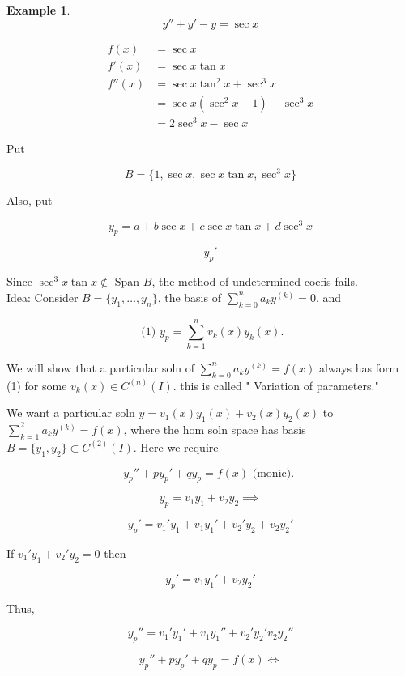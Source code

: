 \documentclass[12pt,a4paper]{article}
\theoremstyle{definition}
\newtheorem*{example}{Example}
\begin{document}
\begin{example}
  \[ y'' + y' - y = \sec x \]

  \begin{align*}
    f(x) &= \sec x \\
    f'(x) &= \sec x \tan x \\
    f''(x) &= \sec x \tan^2x + \sec^3x \\
    &= \sec x (\sec^2x - 1) + \sec^3x \\
    &= 2\sec^3x - \sec x
  \end{align*}

  Put 

  \[ B = \{ 1, \sec x, \sec x \tan x, \sec^3x \}  \]

  Also, put 

  \[ y_p = a + b \sec x + c\sec x \tan x + d \sec^3x \]

  \[ y_p'  \]

  Since \( \sec^3x \tan x \notin  \) Span \( B \), the method of
  undetermined coefis fails. \\[5mm]

  Idea: Consider \( B = \{ y_1, \dots, y_n \} \), the basis of \(
  \sum_{k=0}^{n} a_k y^{(k)} = 0 \), and 

  \[ \text{ (1) } y_p = \sum_{k=1}^{n} v_k(x) y_k(x). \]

  We will show that a particular soln of \( \sum_{k=0}^{n} a_k y^{(k)}
  = f(x)  \) always has form (1) for some \( v_k(x) \in C^{(n)} (I) \).
  this is called " Variation of parameters."

\end{example}


We want a particular soln \( y = v_1(x) y_1(x) + v_2(x) y_2(x) \) to \(
\sum_{k=1}^{2} a_k y^{(k)} = f(x) \), where the hom soln space has basis
\( B = \{ y_1, y_2 \}  \subset C^{(2)}(I) \). Here we require 

\[  y_p'' + py_p' + qy_p = f(x) \text{ (monic). } \]

\[ y_p = v_1y_1 + v_2y_2 \implies \]

\[ y_p' = v_1'y_1 + v_1y_1' + v_2'y_2 + v_2y_2' \]

If \( v_1'y_1 + v_2'y_2 = 0 \) then 

\[ y_p' = v_1y_1' + v_2y_2' \]

Thus, 

\[ y_p'' = v_1'y_1' + v_1y_1'' + v_2'y_2' v_2y_2'' \]

\[ y_p'' +py_p' + qy_p = f(x) \iff \]
\end{document}
